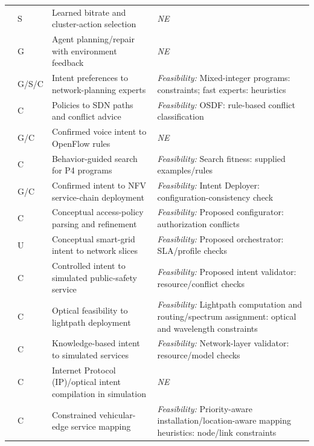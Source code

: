 \begin{longtable}{>{\raggedright\arraybackslash}p{.09\soklitwidth}>{\centering\arraybackslash}p{.07\soklitwidth}>{\raggedright\arraybackslash}p{.36\soklitwidth}>{\raggedright\arraybackslash}p{.48\soklitwidth}}
\addlinespace[1pt]
\cite{wu2024netllm} & S & Learned bitrate and cluster-action selection & \textit{NE} \\
\addlinespace[1pt]
\cite{zhou2025netarena} & G & Agent planning/repair with environment feedback & \textit{NE} \\
\addlinespace[1pt]
\cite{zhu2026omniplan} & G/S/C & Intent preferences to network-planning experts & \emph{Feasibility:} Mixed-integer programs: constraints; fast experts: heuristics \\
\addlinespace[1pt]
\cite{e0arxiv180702205} & C & Policies to SDN paths and conflict advice & \emph{Feasibility:} OSDF: rule-based conflict classification \\
\addlinespace[1pt]
\cite{e0arxiv190403228} & G/C & Confirmed voice intent to OpenFlow rules & \textit{NE} \\
\addlinespace[1pt]
\cite{e0arxiv191000967} & C & Behavior-guided search for P4 programs & \emph{Feasibility:} Search fitness: supplied examples/rules \\
\addlinespace[1pt]
\cite{e0arxiv200805509} & G/C & Confirmed intent to NFV service-chain deployment & \emph{Feasibility:} Intent Deployer: configuration-consistency check \\
\addlinespace[1pt]
\cite{e0arxiv210505179} & C & Conceptual access-policy parsing and refinement & \emph{Feasibility:} Proposed configurator: authorization conflicts \\
\addlinespace[1pt]
\cite{e0arxiv210505594} & U & Conceptual smart-grid intent to network slices & \emph{Feasibility:} Proposed orchestrator: SLA/profile checks \\
\addlinespace[1pt]
\cite{e0arxiv220503932} & C & Controlled intent to simulated public-safety service & \emph{Feasibility:} Proposed intent validator: resource/conflict checks \\
\addlinespace[1pt]
\cite{e0arxiv221211874} & C & Optical feasibility to lightpath deployment & \emph{Feasibility:} Lightpath computation and routing/spectrum assignment: optical and wavelength constraints \\
\addlinespace[1pt]
\cite{e0arxiv230208544} & C & Knowledge-based intent to simulated services & \emph{Feasibility:} Network-layer validator: resource/model checks \\
\addlinespace[1pt]
\cite{e0arxiv230409711} & C & Internet Protocol (IP)/optical intent compilation in simulation & \textit{NE} \\
\addlinespace[1pt]
\cite{e0arxiv230409916} & C & Constrained vehicular-edge service mapping & \emph{Feasibility:} Priority-aware installation/location-aware mapping heuristics: node/link constraints \\

\end{longtable}
